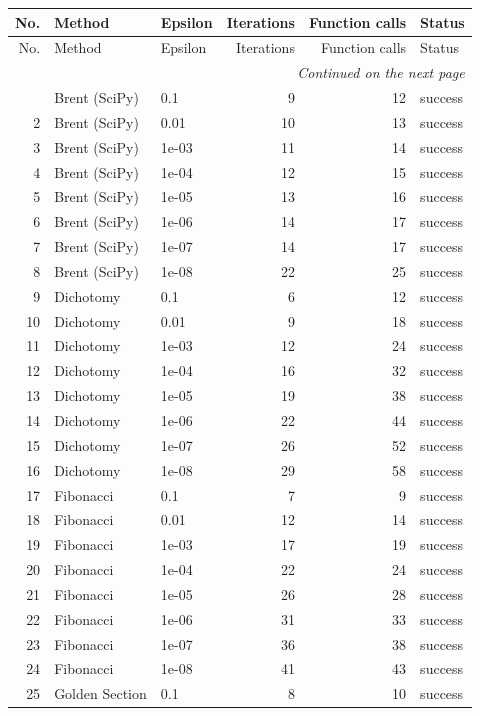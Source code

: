 \begin{longtable}{rllrrl}
\toprule
No. & Method & Epsilon & Iterations & Function calls & Status \\
\midrule
\endfirsthead
\toprule
No. & Method & Epsilon & Iterations & Function calls & Status \\
\midrule
\endhead
\midrule
\multicolumn{6}{r}{\textit{Continued on the next page}} \\
\midrule
\endfoot
\bottomrule
\endlastfoot
1 & Brent (SciPy) & 0.1 & 9 & 12 & success \\
2 & Brent (SciPy) & 0.01 & 10 & 13 & success \\
3 & Brent (SciPy) & 1e-03 & 11 & 14 & success \\
4 & Brent (SciPy) & 1e-04 & 12 & 15 & success \\
5 & Brent (SciPy) & 1e-05 & 13 & 16 & success \\
6 & Brent (SciPy) & 1e-06 & 14 & 17 & success \\
7 & Brent (SciPy) & 1e-07 & 14 & 17 & success \\
8 & Brent (SciPy) & 1e-08 & 22 & 25 & success \\
9 & Dichotomy & 0.1 & 6 & 12 & success \\
10 & Dichotomy & 0.01 & 9 & 18 & success \\
11 & Dichotomy & 1e-03 & 12 & 24 & success \\
12 & Dichotomy & 1e-04 & 16 & 32 & success \\
13 & Dichotomy & 1e-05 & 19 & 38 & success \\
14 & Dichotomy & 1e-06 & 22 & 44 & success \\
15 & Dichotomy & 1e-07 & 26 & 52 & success \\
16 & Dichotomy & 1e-08 & 29 & 58 & success \\
17 & Fibonacci & 0.1 & 7 & 9 & success \\
18 & Fibonacci & 0.01 & 12 & 14 & success \\
19 & Fibonacci & 1e-03 & 17 & 19 & success \\
20 & Fibonacci & 1e-04 & 22 & 24 & success \\
21 & Fibonacci & 1e-05 & 26 & 28 & success \\
22 & Fibonacci & 1e-06 & 31 & 33 & success \\
23 & Fibonacci & 1e-07 & 36 & 38 & success \\
24 & Fibonacci & 1e-08 & 41 & 43 & success \\
25 & Golden Section & 0.1 & 8 & 10 & success \\

\end{longtable}
